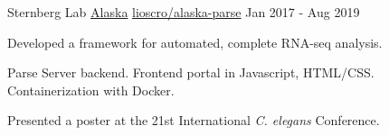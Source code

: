 \begin{cventries}
\cventry
    {Sternberg Lab}
    {\href{https://github.com/Lioscro/alaska-parse}{Alaska}}
    {\faGithub\phantom{a}\href{https://github.com/Lioscro/alaska-parse}{lioscro/alaska-parse}}
    {Jan 2017 - Aug 2019}
    {
     \begin{cvitems} %
       \item Developed a framework for automated, complete RNA-seq analysis.
       \item Parse Server backend. Frontend portal in Javascript, HTML/CSS. Containerization with Docker.
       \item Presented a poster at the 21st International \textit{C. elegans} Conference.
      \end{cvitems}
    }

\end{cventries}
